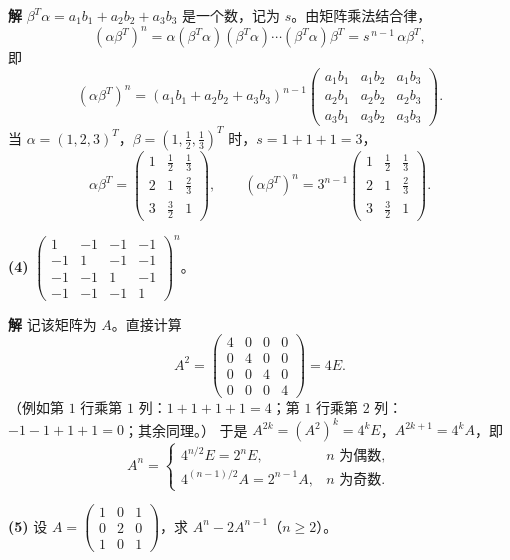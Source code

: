 \documentclass[11pt,a4paper]{ctexart}
\newenvironment{solution}
  {\par\noindent\textbf{解}\quad}
  {\par}
\begin{document}
\begin{solution}
$\beta^T\alpha=a_1b_1+a_2b_2+a_3b_3$ 是一个数，记为 $s$。由矩阵乘法结合律，
\[
(\alpha\beta^T)^n=\alpha(\beta^T\alpha)(\beta^T\alpha)\cdots(\beta^T\alpha)\beta^T
=s^{\,n-1}\,\alpha\beta^T,
\]
即
\[
(\alpha\beta^T)^n=(a_1b_1+a_2b_2+a_3b_3)^{n-1}
\begin{pmatrix}a_1b_1&a_1b_2&a_1b_3\\a_2b_1&a_2b_2&a_2b_3\\a_3b_1&a_3b_2&a_3b_3\end{pmatrix}.
\]
当 $\alpha=(1,2,3)^T$，$\beta=(1,\frac12,\frac13)^T$ 时，$s=1+1+1=3$，
\[
\alpha\beta^T=\begin{pmatrix}1&\frac12&\frac13\\2&1&\frac23\\3&\frac32&1\end{pmatrix},
\qquad
(\alpha\beta^T)^n=3^{n-1}\begin{pmatrix}1&\frac12&\frac13\\2&1&\frac23\\3&\frac32&1\end{pmatrix}.
\]
\end{solution}

\textbf{(4)} $\begin{pmatrix}1&-1&-1&-1\\-1&1&-1&-1\\-1&-1&1&-1\\-1&-1&-1&1\end{pmatrix}^n$。

\begin{solution}
记该矩阵为 $A$。直接计算
\[
A^2=\begin{pmatrix}4&0&0&0\\0&4&0&0\\0&0&4&0\\0&0&0&4\end{pmatrix}=4E.
\]
（例如第 $1$ 行乘第 $1$ 列：$1+1+1+1=4$；第 $1$ 行乘第 $2$ 列：$-1-1+1+1=0$；其余同理。）
于是 $A^{2k}=(A^2)^k=4^kE$，$A^{2k+1}=4^kA$，即
\[
A^n=\begin{cases}
4^{n/2}E=2^nE, & n \text{ 为偶数},\\[4pt]
4^{(n-1)/2}A=2^{n-1}A, & n \text{ 为奇数}.
\end{cases}
\]
\end{solution}

\textbf{(5)} 设 $A=\begin{pmatrix}1&0&1\\0&2&0\\1&0&1\end{pmatrix}$，求 $A^n-2A^{n-1}$（$n\ge2$）。
\end{document}
